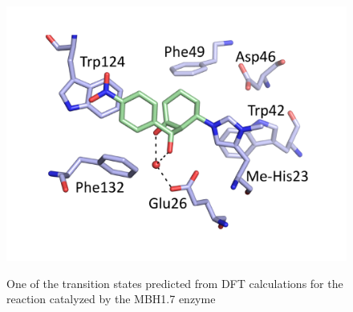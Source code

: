 \documentclass[%
preprint,
 amsmath,amssymb,
 aps,
prb,
]{revtex4-2}
\begin{document}
%
\begin{figure}[ht!]
\centering
\includegraphics[scale=0.35]{figures/exp-ts1.pdf}
\label{fig:exp-ts1}
\caption{One of the transition states predicted from DFT calculations for the reaction catalyzed by the MBH1.7 enzyme}
\end{figure}
\newpage
\end{document}
